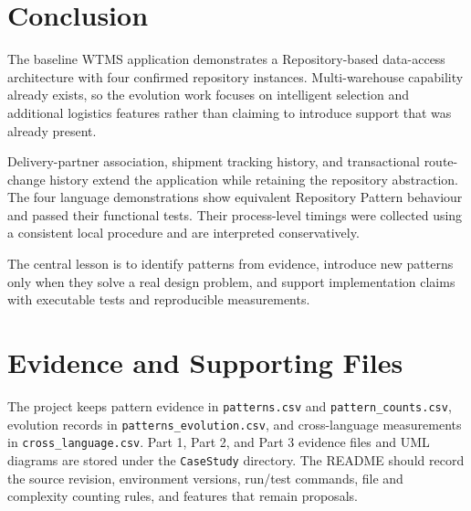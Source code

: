 \documentclass[12pt,a4paper]{article}
\begin{document}
\section{Conclusion}
The baseline WTMS application demonstrates a Repository-based data-access architecture with four confirmed repository instances. Multi-warehouse capability already exists, so the evolution work focuses on intelligent selection and additional logistics features rather than claiming to introduce support that was already present.

Delivery-partner association, shipment tracking history, and transactional route-change history extend the application while retaining the repository abstraction. The four language demonstrations show equivalent Repository Pattern behaviour and passed their functional tests. Their process-level timings were collected using a consistent local procedure and are interpreted conservatively.

The central lesson is to identify patterns from evidence, introduce new patterns only when they solve a real design problem, and support implementation claims with executable tests and reproducible measurements.

\appendix
\section{Evidence and Supporting Files}
The project keeps pattern evidence in \texttt{patterns.csv} and \texttt{pattern\_counts.csv}, evolution records in \texttt{patterns\_evolution.csv}, and cross-language measurements in \texttt{cross\_language.csv}. Part 1, Part 2, and Part 3 evidence files and UML diagrams are stored under the \texttt{CaseStudy} directory. The README should record the source revision, environment versions, run/test commands, file and complexity counting rules, and features that remain proposals.
\end{document}
